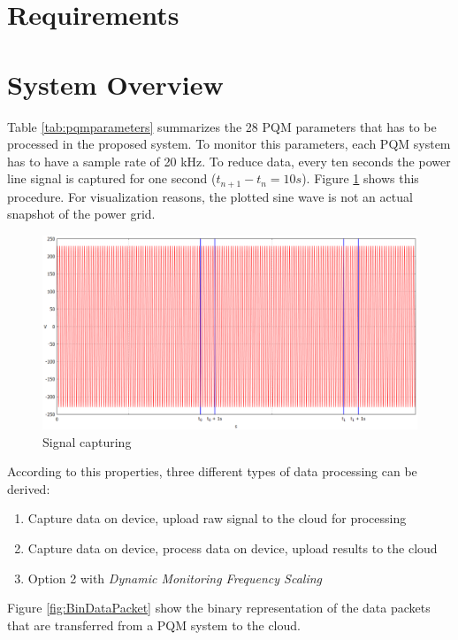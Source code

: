 \section{Requirements}

\section{System Overview}
Table \ref{tab:pqmparameters} summarizes the 28 PQM parameters that has to be processed in the proposed system. To monitor this parameters, each PQM system has to have a sample rate of 20 kHz. To reduce data, every ten seconds the power line signal is captured for one second ($t_{n+1} - t_n = 10s$). Figure \ref{fig:sysdesign} shows this procedure. For visualization reasons, the plotted sine wave is not an actual snapshot of the power grid.

\begin{figure}[h]
	\centering
		\includegraphics[scale=0.45]{graphics/sysdesign.eps}
	\caption{Signal capturing}
	\label{fig:sysdesign}
\end{figure}

According to this properties, three different types of data processing can be derived:

\begin{enumerate}
	\item Capture data on device, upload raw signal to the cloud for processing
	\item Capture data on device, process data on device, upload results to the cloud
	\item Option 2 with \textit{Dynamic Monitoring Frequency Scaling}
\end{enumerate}

Figure \ref{fig:BinDataPacket} show the binary representation of the data packets that are transferred from a PQM system to the cloud.

